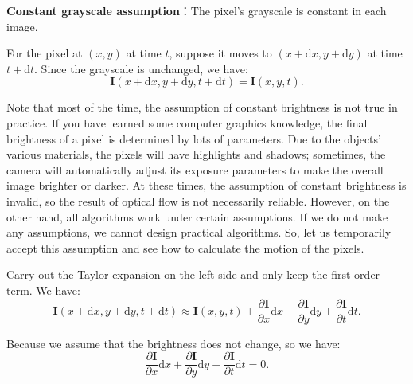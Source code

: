 \textbf{Constant grayscale assumption}：The pixel's grayscale is constant in each image.

For the pixel at $(x,y)$ at time $t$, suppose it moves to $(x+\mathrm{d}x, y+\mathrm{d}y)$ at time $t+\mathrm{d}t$. Since the grayscale is unchanged, we have:
\begin{equation} 
\mathbf{I}(x+\mathrm{d}x, y+\mathrm{d}y, t+\mathrm{d}t) = \mathbf{I} (x,y,t).
\end{equation}

Note that most of the time, the assumption of constant brightness is not true in practice. If you have learned some computer graphics knowledge, the final brightness of a pixel is determined by lots of parameters. Due to the objects' various materials, the pixels will have highlights and shadows; sometimes, the camera will automatically adjust its exposure parameters to make the overall image brighter or darker. At these times, the assumption of constant brightness is invalid, so the result of optical flow is not necessarily reliable. However, on the other hand, all algorithms work under certain assumptions. If we do not make any assumptions, we cannot design practical algorithms. So, let us temporarily accept this assumption and see how to calculate the motion of the pixels.

Carry out the Taylor expansion on the left side and only keep the first-order term. We have:
\begin{equation}
\mathbf{I} \left( {x + \mathrm{d}x,y + \mathrm{d}y,t + \mathrm{d}t} \right) \approx \mathbf{I} \left( {x,y,t} \right) + \frac{{\partial \mathbf{I} }}{{\partial x}}\mathrm{d}x + \frac{{\partial \mathbf{I}}}{{\partial y}}\mathrm{d}y + \frac{{\partial \mathbf{I}}}{{\partial t}}\mathrm{d}t.
\end{equation}

Because we assume that the brightness does not change, so we have:
\begin{equation}
 \frac{{\partial \mathbf{I} }}{{\partial x}}\mathrm{d}x + \frac{{\partial \mathbf{I}}}{{\partial y}}\mathrm{d}y + \frac{{\partial \mathbf{I}}}{{\partial t}}\mathrm{d}t = 0.
\end{equation}

